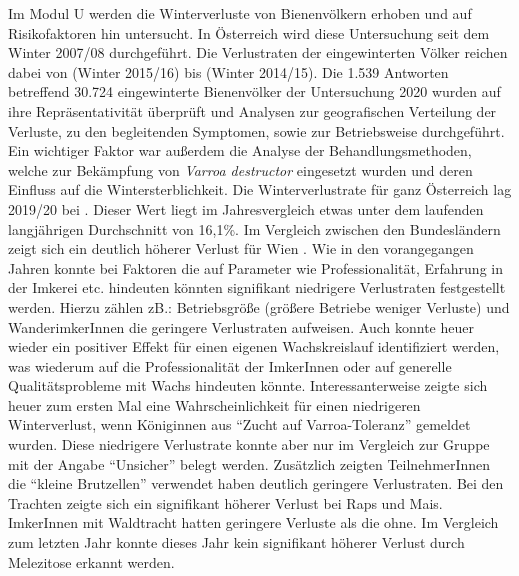 Im Modul U werden die Winterverluste von Bienenvölkern erhoben und auf Risikofaktoren hin untersucht. In Österreich wird diese Untersuchung seit dem Winter 2007/08 durchgeführt. Die Verlustraten der eingewinterten Völker reichen dabei von  (Winter 2015/16) bis  (Winter 2014/15). 
\newline
Die 1.539 Antworten betreffend 30.724 eingewinterte Bienenvölker der Untersuchung 2020 wurden auf ihre Repräsentativität überprüft und Analysen zur geografischen Verteilung der Verluste, zu den begleitenden Symptomen, sowie zur Betriebsweise durchgeführt. Ein wichtiger Faktor war außerdem die Analyse der Behandlungsmethoden, welche zur Bekämpfung von \textit{Varroa destructor} eingesetzt wurden und deren Einfluss auf die Wintersterblichkeit.
\newline
Die Winterverlustrate für ganz Österreich lag 2019/20 bei . Dieser Wert liegt im Jahresvergleich etwas unter dem laufenden langjährigen Durchschnitt von 16,1\%. Im Vergleich zwischen den Bundesländern zeigt sich ein deutlich höherer Verlust für Wien .
\newline
Wie in den vorangegangen Jahren konnte bei Faktoren die auf Parameter wie Professionalität, Erfahrung in der Imkerei etc. hindeuten könnten signifikant niedrigere Verlustraten festgestellt werden. Hierzu zählen zB.: Betriebsgröße (größere Betriebe weniger Verluste) und WanderimkerInnen die geringere Verlustraten aufweisen. Auch konnte heuer wieder ein positiver Effekt für einen eigenen Wachskreislauf identifiziert werden, was wiederum auf die Professionalität der ImkerInnen oder auf generelle Qualitätsprobleme mit Wachs hindeuten könnte. 
\newline
Interessanterweise zeigte sich heuer zum ersten Mal eine Wahrscheinlichkeit für einen niedrigeren Winterverlust, wenn Königinnen aus \enquote{Zucht auf Varroa-Toleranz} gemeldet wurden. Diese niedrigere Verlustrate konnte aber nur im Vergleich zur Gruppe mit der Angabe \enquote{Unsicher} belegt werden. Zusätzlich zeigten TeilnehmerInnen die \enquote{kleine Brutzellen} verwendet haben deutlich geringere Verlustraten.
\newline
Bei den Trachten zeigte sich ein signifikant höherer Verlust bei Raps und Mais. ImkerInnen mit Waldtracht hatten geringere Verluste als die ohne. Im Vergleich zum letzten Jahr konnte dieses Jahr kein signifikant höherer Verlust durch Melezitose erkannt werden. 
\newline

